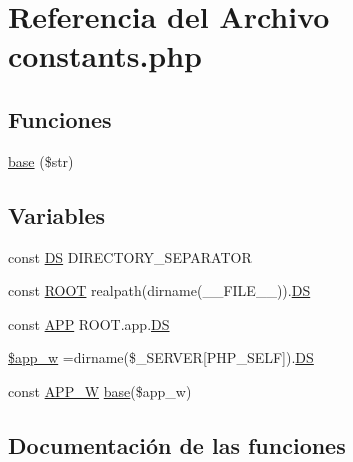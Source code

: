 \hypertarget{constants_8php}{}\section{Referencia del Archivo constants.\+php}
\label{constants_8php}
\subsection*{Funciones}
\begin{DoxyCompactItemize}
\item 
\hyperlink{constants_8php_a09763541667d8e51df70865805cc29ee}{base} (\$str)
\end{DoxyCompactItemize}
\subsection*{Variables}
\begin{DoxyCompactItemize}
\item 
const \hyperlink{constants_8php_ae073998f73900b8375397889044c8313}{D\+S} D\+I\+R\+E\+C\+T\+O\+R\+Y\+\_\+\+S\+E\+P\+A\+R\+A\+T\+O\+R
\item 
const \hyperlink{constants_8php_a18c0644836e196aed6d63779e14d6bd8}{R\+O\+O\+T} realpath(dirname(\+\_\+\+\_\+\+F\+I\+L\+E\+\_\+\+\_\+)).\hyperlink{constants_8php_ae073998f73900b8375397889044c8313}{D\+S}
\item 
const \hyperlink{constants_8php_a0209851fb6790e1be57a9edf2107c091}{A\+P\+P} R\+O\+O\+T.\textquotesingle{}app\textquotesingle{}.\hyperlink{constants_8php_ae073998f73900b8375397889044c8313}{D\+S}
\item 
\hyperlink{constants_8php_aba44f7d2f4078b9cb6bb51dcc121f414}{\$app\+\_\+w} =dirname(\$\+\_\+\+S\+E\+R\+V\+E\+R\mbox{[}\textquotesingle{}P\+H\+P\+\_\+\+S\+E\+L\+F\textquotesingle{}\mbox{]}).\hyperlink{constants_8php_ae073998f73900b8375397889044c8313}{D\+S}
\item 
const \hyperlink{constants_8php_a1c000d3159a0f3eefd9732412d15a402}{A\+P\+P\+\_\+\+W} \hyperlink{constants_8php_a09763541667d8e51df70865805cc29ee}{base}(\$app\+\_\+w)
\end{DoxyCompactItemize}


\subsection{Documentación de las funciones}
\hypertarget{constants_8php_a09763541667d8e51df70865805cc29ee}{}
